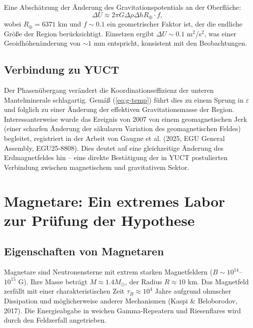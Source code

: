 \documentclass[12pt]{article}
\theoremstyle{remark}
\newcommand{\eps}{\varepsilon}
\begin{document}
	Eine Abschätzung der Änderung des Gravitationspotentials an der Oberfläche:
	\begin{equation}
		\Delta U \approx 2\pi G \Delta\rho \Delta h R_\oplus \cdot f,
		\label{eq:delta-u}
	\end{equation}
	wobei $R_\oplus = 6371$ km und $f \sim 0.1$ ein geometrischer Faktor ist, der die endliche Größe der Region berücksichtigt. Einsetzen ergibt $\Delta U \sim 0.1$ m$^2$/s$^2$, was einer Geoidhöhenänderung von $\sim 1$ mm entspricht, konsistent mit den Beobachtungen.
	
	\subsection{Verbindung zu YUCT}
	\label{subsec:grace-yuct}
	
	Der Phasenübergang verändert die Koordinationseffizienz der unteren Mantelminerale schlagartig. Gemäß (\ref{eq:g-temp}) führt dies zu einem Sprung in $\eps$ und folglich zu einer Änderung der effektiven Gravitationsmasse der Region. Interessanterweise wurde das Ereignis von 2007 von einem geomagnetischen Jerk (einer scharfen Änderung der säkularen Variation des geomagnetischen Feldes) begleitet, registriert in der Arbeit von Gaugne et al. (2025, EGU General Assembly, EGU25-8808). Dies deutet auf eine gleichzeitige Änderung des Erdmagnetfeldes hin – eine direkte Bestätigung der in YUCT postulierten Verbindung zwischen magnetischem und gravitativem Sektor.
	
	\section{Magnetare: Ein extremes Labor zur Prüfung der Hypothese}
	\label{sec:magnetars}
	
	\subsection{Eigenschaften von Magnetaren}
	\label{subsec:magnetars-properties}
	
	Magnetare sind Neutronensterne mit extrem starken Magnetfeldern ($B \sim 10^{14}$–$10^{15}$ G). Ihre Masse beträgt $M \approx 1.4 M_\odot$, der Radius $R \approx 10$ km. Das Magnetfeld zerfällt mit einer charakteristischen Zeit $\tau_B \approx 10^4$ Jahre aufgrund ohmscher Dissipation und möglicherweise anderer Mechanismen (Kaspi \& Beloborodov, 2017). Die Energieabgabe in weichen Gamma-Repeatern und Riesenflares wird durch den Feldzerfall angetrieben.
	
\end{document}
